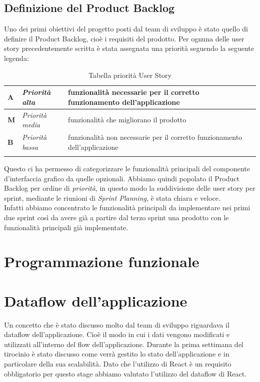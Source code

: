 \subsection{Definizione del Product Backlog}
Uno dei primi obiettivi del progetto posti dal team di sviluppo è stato quello di definire il Product Backlog, cioè i requisiti del prodotto. Per ognuna delle user story precedentemente scritta è stata assegnata una priorità seguendo la seguente legenda:
\begin{longtable} {
		|>{\centering}p{10mm}| 
		|>{}p{25mm}|
		|>{}p{85mm}|
		>{}p{0mm}}
	\hline
	\textbf{A} & \textit{Priorità alta}  & funzionalità necessarie per il corretto funzionamento dell'applicazione \\ \hline
	\textbf{M} & \textit{Priorità media} & funzionalità che migliorano il prodotto \\ \hline
	\textbf{B} & \textit{Priorità bassa} & funzionalità non necessarie per il corretto funzionamento dell'applicazione \\ \hline
	\hline
	\caption{Tabella priorità User Story}
\end{longtable}
\noindent
Questo ci ha permesso di categorizzare le funzionalità principali del componente d'interfaccia grafico da quelle opzionali. Abbiamo quindi popolato il Product Backlog per ordine di \textit{priorità}, in questo modo la suddivisione delle user story per sprint, mediante le riunioni di \textit{Sprint Planning}, è stata chiara e veloce. \\
Infatti abbiamo concentrato le funzionalità principali da implementare nei primi due sprint così da avere già a partire dal terzo sprint una prodotto con le funzionalità principali già implementate.

\section{Programmazione funzionale}

\section{Dataflow dell'applicazione}
Un concetto che è stato discusso molto dal team di sviluppo riguardava il dataflow dell'applicazione. Cioè il modo in cui i dati vengono modificati e utilizzati all'interno del flow dell'applicazione. Durante la prima settimana del tirocinio è stato discusso come verrà gestito lo stato dell'applicazione e in particolare della sua scalabilità. Dato che l'utilizzo di React è un requisito obbligatorio per questo stage abbiamo valutato l'utilizzo del dataflow di React.


